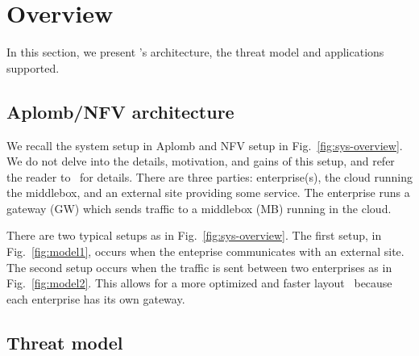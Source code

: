 


     
\section{Overview}\label{sec:overview}


In this section, we present \sys's architecture, the threat model and applications supported.


\subsection{Aplomb/NFV architecture}

We recall the system setup in Aplomb and NFV setup  in Fig.~\ref{fig:sys-overview}.
We do not delve into the details, motivation, and gains of this setup, and refer the reader to~\cite{aplomb} for details. 
There are three parties: enterprise(s), the cloud running the middlebox, and an external site providing
some service. 
The enterprise runs a gateway (GW) which sends traffic to a middlebox (MB) running in the cloud.

There are two typical setups as in Fig.~\ref{fig:sys-overview}.  The first setup, in Fig.~\ref{fig:model1},  occurs when the enteprise communicates with an external site. The second setup occurs when the traffic is sent between two enterprises as in Fig.~\ref{fig:model2}. This allows for a more optimized and faster layout~\cite{aplomb} because  each enterprise has its own gateway.












\subsection{Threat model}

